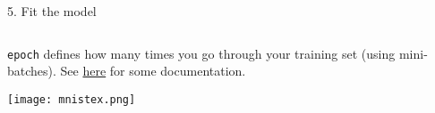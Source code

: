 \documentclass[10pt,ignorenonframetext,]{beamer}
\newenvironment{Shaded}{\begin{snugshade}}{\end{snugshade}}
\newcommand{\DataTypeTok}[1]{\textcolor[rgb]{0.13,0.29,0.53}{#1}}
\newcommand{\DecValTok}[1]{\textcolor[rgb]{0.00,0.00,0.81}{#1}}
\newcommand{\KeywordTok}[1]{\textcolor[rgb]{0.13,0.29,0.53}{\textbf{#1}}}
\newcommand{\NormalTok}[1]{#1}
\newcommand{\OperatorTok}[1]{\textcolor[rgb]{0.81,0.36,0.00}{\textbf{#1}}}
\newcommand{\StringTok}[1]{\textcolor[rgb]{0.31,0.60,0.02}{#1}}
\begin{document}
\begin{frame}[fragile]

\begin{block}{5. Fit the model}

\(~\)

\scriptsize

\begin{Shaded}
\end{Shaded}

\normalsize

\texttt{epoch} defines how many times you go through your training set
(using mini-batches). See
\href{https://keras.io/getting-started/faq/\#what-does-sample-batch-epoch-mean}{here}
for some documentation.

\centering

\texttt{[image: mnistex.png]}

\end{block}

\end{frame}
\end{document}
